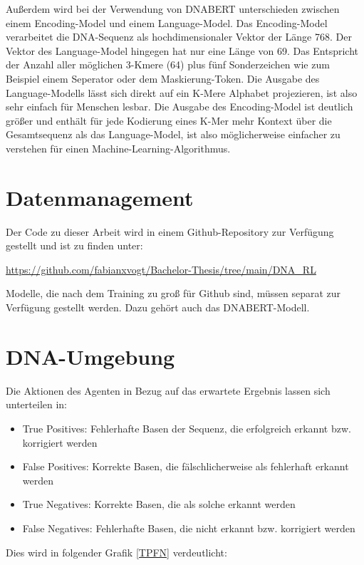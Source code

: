 \documentclass[oneside,bibliography=totocnumbered,BCOR=5mm]{scrbook}%
\theoremstyle{definition}
\theoremstyle{definition}
\theoremstyle{definition}
\theoremstyle{definition}
\theoremstyle{definition}
\theoremstyle{definition}
\begin{document}
Außerdem wird bei der Verwendung von DNABERT unterschieden zwischen einem Encoding-Model und einem Language-Model.
Das Encoding-Model verarbeitet die DNA-Sequenz als hochdimensionaler Vektor der Länge 768. 
Der Vektor des Language-Model hingegen hat nur eine Länge von 69. Das Entspricht der Anzahl aller möglichen
3-Kmere (64) plus fünf Sonderzeichen wie zum Beispiel einem Seperator oder dem Maskierung-Token.
Die Ausgabe des Language-Modells lässt sich direkt auf ein K-Mere Alphabet projezieren, 
ist also sehr einfach für Menschen lesbar. Die Ausgabe des Encoding-Model ist deutlich größer und
enthält für jede Kodierung eines K-Mer mehr Kontext über die Gesamtsequenz als das Language-Model,
ist also möglicherweise einfacher zu verstehen für einen Machine-Learning-Algorithmus.

\section{Datenmanagement}
Der Code zu dieser Arbeit wird in einem Github-Repository zur Verfügung gestellt und ist zu finden unter:\linebreak[4]

\url{https://github.com/fabianxvogt/Bachelor-Thesis/tree/main/DNA_RL}\linebreak[4]


Modelle, die nach dem Training zu groß für Github sind, müssen separat zur Verfügung gestellt werden.
Dazu gehört auch das DNABERT-Modell.


\section{DNA-Umgebung}

Die Aktionen des Agenten in Bezug auf das erwartete Ergebnis lassen sich unterteilen in:


\begin{itemize}
  \item True Positives: Fehlerhafte Basen der Sequenz, die erfolgreich erkannt bzw. korrigiert werden
  \item False Positives: Korrekte Basen, die fälschlicherweise als fehlerhaft erkannt werden
  \item True Negatives: Korrekte Basen, die als solche erkannt werden
  \item False Negatives: Fehlerhafte Basen, die nicht erkannt bzw. korrigiert werden
\end{itemize}
Dies wird in folgender Grafik \ref{TPFN} verdeutlicht:
\end{document}

